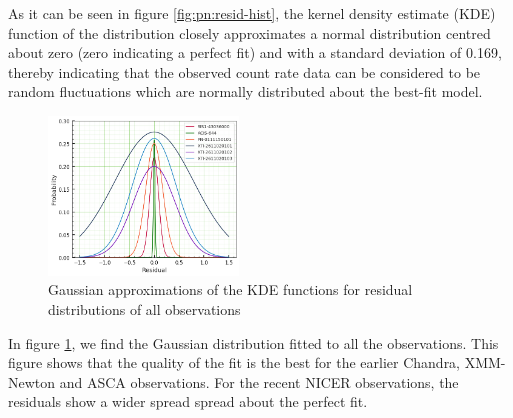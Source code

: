     As it can be seen in figure \ref{fig:pn:resid-hist}, the kernel density estimate (KDE) function of the distribution closely approximates a normal distribution centred about zero (zero indicating a perfect fit) and with a standard deviation of 0.169, thereby indicating that the observed count rate data can be considered to be random fluctuations which are normally distributed about the best-fit model.
    
    \begin{figure}[!htb]
    	\centering
    	\includegraphics[width=0.45\textwidth]{figures/resid/mr-vel-resid-gaussfit_all-obs.png}
    	\caption{Gaussian approximations of the KDE functions for residual distributions of all observations}
    	\label{fig:all-obs:resid-gaussfit}
    \end{figure}
    
    In figure \ref{fig:all-obs:resid-gaussfit}, we find the Gaussian distribution fitted to all the observations. This figure shows that the quality of the fit is the best for the earlier Chandra, XMM-Newton and ASCA observations. For the recent NICER observations, the residuals show a wider spread spread about the perfect fit.
